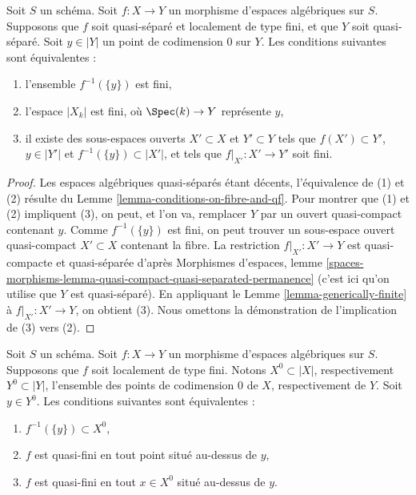 \begin{lemma}
\label{lemma-generically-finite-reprise}
Soit $S$ un schéma. Soit $f : X \to Y$ un morphisme d'espaces algébriques
sur $S$. Supposons que $f$ soit quasi-séparé et localement de type fini,
et que $Y$ soit quasi-séparé. Soit $y \in |Y|$ un point de codimension $0$
sur $Y$. Les conditions suivantes sont équivalentes :
\begin{enumerate}
\item l'ensemble $f^{-1}(\{y\})$ est fini,
\item l'espace $|X_k|$ est fini, où $\Spec(k) \to Y$ représente $y$,
\item il existe des sous-espaces ouverts $X' \subset X$ et $Y' \subset Y$
tels que $f(X') \subset Y'$, $y \in |Y'|$ et
$f^{-1}(\{y\}) \subset |X'|$, et tels que
$f|_{X'} : X' \to Y'$ soit fini.
\end{enumerate}
\end{lemma}

\begin{proof}
Les espaces algébriques quasi-séparés étant décents, l'équivalence de (1)
et (2) résulte du Lemme \ref{lemma-conditions-on-fibre-and-qf}.
Pour montrer que (1) et (2) impliquent (3), on peut, et l'on va, remplacer
$Y$ par un ouvert quasi-compact contenant $y$.
Comme $f^{-1}(\{y\})$ est fini, on peut trouver un sous-espace ouvert
quasi-compact $X' \subset X$ contenant la fibre.
La restriction $f|_{X'} : X' \to Y$ est quasi-compacte et quasi-séparée
d'après Morphismes d'espaces, lemme
\ref{spaces-morphisms-lemma-quasi-compact-quasi-separated-permanence}
(c'est ici qu'on utilise que $Y$ est quasi-séparé).
En appliquant le Lemme \ref{lemma-generically-finite} à
$f|_{X'} : X' \to Y$, on obtient (3).
Nous omettons la démonstration de l'implication de (3) vers (2).
\end{proof}

\begin{lemma}
\label{lemma-quasi-finiteness-over-generic-point}
Soit $S$ un schéma. Soit $f : X \to Y$ un morphisme d'espaces algébriques
sur $S$. Supposons que $f$ soit localement de type fini.
Notons $X^0 \subset |X|$, respectivement $Y^0 \subset |Y|$, l'ensemble des
points de codimension $0$ de $X$, respectivement de $Y$. Soit $y \in Y^0$.
Les conditions suivantes sont équivalentes :
\begin{enumerate}
\item $f^{-1}(\{y\}) \subset X^0$,
\item $f$ est quasi-fini en tout point situé au-dessus de $y$,
\item $f$ est quasi-fini en tout $x \in X^0$ situé au-dessus de $y$.
\end{enumerate}
\end{lemma}

